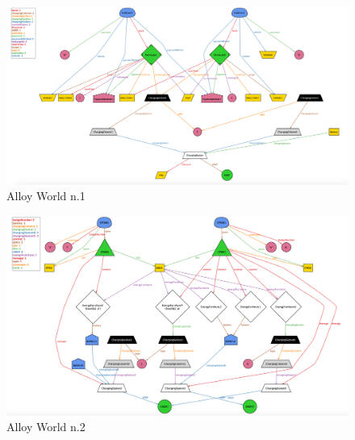 \documentclass[a4paper]{report}
\begin{document}
\begin{landscape}

\begin{figure}[hp]
\includegraphics[angle=0, scale=0.55]{world1}
\caption{Alloy World n.1}
\label{fig:world1}
\end{figure}
\end{landscape}

\begin{landscape}
\begin{figure}[hp]
\includegraphics[angle=0, scale = 0.65]{world2}
\caption{Alloy World n.2}
\label{fig:world2}
\end{figure}
\end{landscape}
\end{document}
